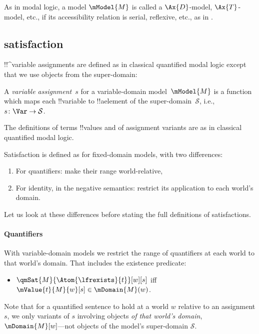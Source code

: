 \documentclass[../../../../include/open-logic-section]{subfiles}
\begin{document}
\begin{rem}
  As in modal logic, a model $\mModel{M}$ is called a $\Ax{D}$-model, 
  $\Ax{T}$-model, etc., if its accessibility relation is serial,
  reflexive, etc., as in . 
\end{rem}

\subsection{satisfaction}

!!^{variable} assignments are defined as in classical quantified modal 
logic except that we use objects from the super-domain:

\begin{defn}
A \emph{variable assignment}~$s$ for a variable-domain model~$\mModel{M}$ 
is a function which maps each !!{variable} to !!a{element} of
the super-domain~$\mathcal{S}$,
i.e., $s\colon \Var \to \mathcal{S}$.
\end{defn}

The definitions of terms !!{value}s and of 
assignment variants are as in classical quantified modal logic.


Satisfaction is defined as for fixed-domain models, with two differences:
\begin{enumerate}
\item For quantifiers: make their range world-relative,
\item For identity, in the negative semantics: restrict its application
to each world's domain.
\end{enumerate}
Let us look at these differences before stating the full 
definitions of satisfactions. 

\paragraph{Quantifiers} With variable-domain models we restrict the range of 
quantifiers at each world to that world's domain. That includes
the existence predicate:
\begin{itemize}
\item $\qmSat{M}{\Atom{\lfrexists}{t}}[w][s]$ iff 
  $\mValue{t}{M}{w}[s]\in \mDomain{M}(w)$.


\end{itemize}
Note that for a quantified sentence to hold at a world 
$w$ relative to an assignment $s$, we only variants
of $s$ involving objects \emph{of that world's domain}, 
$\mDomain{M}[w]$---not objects of the model's super-domain
 $\mathcal{S}$.
\end{document}
